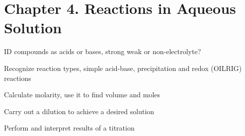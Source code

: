 \section{Chapter 4. Reactions in Aqueous Solution}

\secttoc

{\footnotesize
\begin{multicols}{3}
\begin{compactenum}
    \item ID compounds as acids or bases, strong weak or non-electrolyte?
    \item Recognize reaction types, simple acid-base, precipitation and
        redox (OILRIG) reactions
    \item Calculate molarity, use it to find volume and moles
    \item Carry out a dilution to achieve a desired solution
    \item Perform and interpret results of a titration
\end{compactenum}
\end{multicols}
}


